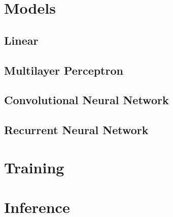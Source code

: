 \section{Models}\label{models}
\subsection{Linear}
\subsection{Multilayer Perceptron}
\subsection{Convolutional Neural Network}
\subsection{Recurrent Neural Network}
\section{Training}\label{training}
\section{Inference}\label{inference}
